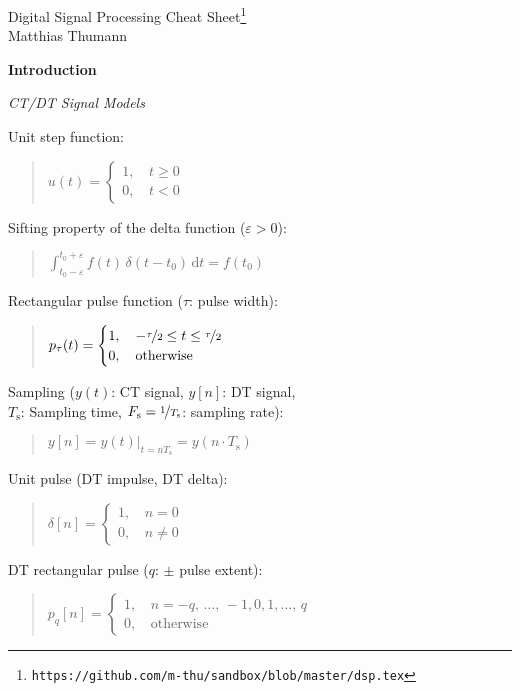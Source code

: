 \documentclass[fontsize=9pt,a4paper,twocolumn]{scrartcl}
\begin{document}
\clearpage
\pagestyle{empty}
\huge{Digital Signal Processing Cheat Sheet}\footnote{\small{\texttt{https://github.com/m-thu/sandbox/blob/master/dsp.tex}}}\\
\large{Matthias Thumann}
\vspace*{0.5cm}

\large{\textbf{Introduction}}

\textit{CT/DT Signal Models}

Unit step function:
\begin{quote}
	$u(t)=\begin{cases}1,\, & t\geq 0\\0,\, & t<0\end{cases}$
\end{quote}

Sifting property of the delta function ($\varepsilon>0$):
\begin{quote}
	$\int_{t_0-\varepsilon}^{t_0+\varepsilon} f(t)\,\delta(t-t_0)\,\mathrm{d}t = f(t_0)$
\end{quote}

Rectangular pulse function ($\tau$: pulse width):
\begin{quote}
	$p_\tau(t)=\begin{cases}1,\, & -\nicefrac{\tau}{2}\leq t\leq\nicefrac{\tau}{2}\\ 0,\,&\text{otherwise}\end{cases}$
\end{quote}

Sampling ($y(t)$: CT signal, $y[n]$: DT signal,\\ $T_\mathrm{s}$: Sampling time, $F_\mathrm{s}=\nicefrac{1}{T_\mathrm{s}}$: sampling rate):
\begin{quote}
	$y[n] = \left. y(t)\right|_{t=nT_\mathrm{s}} = y(n\cdot T_\mathrm{s})$
\end{quote}

Unit pulse (DT impulse, DT delta):
\begin{quote}
	$\delta[n] = \begin{cases}1,\, & n=0\\ 0,\, & n\neq 0\end{cases}$
\end{quote}

DT rectangular pulse ($q$: $\pm$ pulse extent):
\begin{quote}
	$p_q[n] = \begin{cases}1,\, & n=-q,\,\dots,\,-1,0,1,\dots,\,q\\ 0,\, & \text{otherwise}\end{cases}$
\end{quote}
\end{document}
